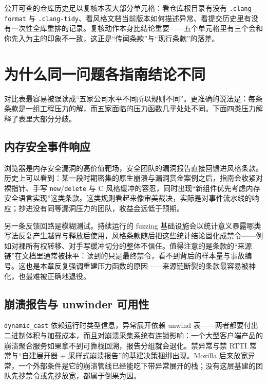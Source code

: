 \documentclass[12pt,a4paper,fontset=fandol]{ctexbook}
\newcommand{\Tp}[1]{\texttt{#1}}
\newcommand{\Bk}{\discretionary{}{}{}}
\begin{document}
\begin{note}[title={给每个单元格补年代戳的方法}]
公开可查的仓库历史足以复核本表大部分单元格：看仓库根目录有没有 \Tp{.clang-\allowbreak format} 与 \Tp{.clang-tidy}、看风格文档当前版本如何描述异常、看提交历史里有没有一次性全库重排的记录。复核动作本身比结论重要——五个单元格里有三个会和你先入为主的印象不一致，这正是``传闻条款''与``现行条款''的落差。
\end{note}

\section{为什么同一问题各指南结论不同}
\label{sec:ch04-why-differ}

对比表最容易被误读成``五家公司水平不同所以规则不同''。更准确的说法是：每条条款是一组工程压力的解，而五家面临的压力函数几乎处处不同。下面四类压力解释了表里大部分分歧。

\subsection{内存安全事件响应}
\label{sec:ch04-memsafe-pressure}

浏览器是内存安全漏洞的高价值靶场，安全团队的漏洞报告直接回馈进风格条款。历史上可以看到：某一段时期密集的原生崩溃与漏洞赏金案例之后，指南会收紧对裸指针、手写 \Tp{new}/{\Bk}\Tp{delete} 与 C 风格缓冲的容忍，同时出现``新组件优先考虑内存安全语言实现''这类条款。这类规则看起来像审美裁决，实际是对事件流水线的响应；抄进没有同等漏洞压力的团队，收益会远低于预期。

另一条反馈回路是模糊测试。持续运行的 fuzzing 基础设施会以统计意义暴露哪类写法反复产生越界与释放后使用，风格条款随后把这些统计结论固化成禁令——例如对裸所有权转移、对手写缓冲切分的整体不信任。值得注意的是条款的``来源链''在文档里通常被抹平：读到的只是最终禁令，看不到背后的样本量与事故编号。这也是本章反复强调重建压力函数的原因——来源链断裂的条款最容易被神化，也最难被正确地退役。

\subsection{崩溃报告与 unwinder 可用性}
\label{sec:ch04-unwinder-pressure}

\Tp{dynamic\_\allowbreak cast} 依赖运行时类型信息，异常展开依赖 unwind 表——两者都要付出二进制体积与加载成本，而且对崩溃采集系统有连锁影响：一个大型客户端产品的崩溃聚合服务如果拿不到可靠栈回溯，报告分组就会退化。禁异常与禁 RTTI 常常与``自建展开器 + 采样式崩溃报告''的基建决策捆绑出现。Mozilla 后来放宽异常，一个外部条件是它的崩溃管线已经能吃下带异常展开的栈；没有这层基建的团队先抄禁令或先抄放宽，都属于倒果为因。
\end{document}
